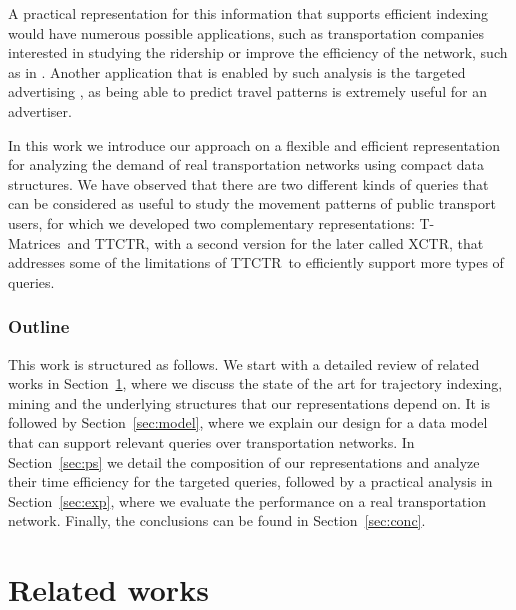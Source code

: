 \documentclass[runningheads]{llncs}
\newcommand{\acumm}{T-Matrices} %
\newcommand{\ctr}{XCTR}
\newcommand{\ttctr}{TTCTR}
\begin{document}
A practical representation for this information that supports efficient indexing would have numerous possible applications, such as transportation companies interested in studying the ridership \cite{tu2018spatial} or improve the efficiency of the network, such as in \cite{weng2018mining}. Another application that is enabled by such analysis is the targeted advertising \cite{zhang2017targeted}, as being able to predict travel patterns is extremely useful for an advertiser.


In this work we introduce our approach on a flexible and efficient representation for analyzing the demand of real transportation networks using compact data structures. We have observed that there are two different kinds of queries that can be considered as useful to study the movement patterns of public transport users, for which we developed two complementary representations: \acumm~and \ttctr, with a second version for the later called \ctr, that addresses some of the limitations of \ttctr~to efficiently support more types of queries.

\subsubsection{Outline}
This work is structured as follows. We start with a detailed review of related works in Section~\ref{sec:rw}, where we discuss the state of the art for trajectory indexing, mining and the underlying structures that our representations depend on. It is followed by Section~\ref{sec:model}, where we explain our design for a data model that can support relevant queries over transportation networks. In Section~\ref{sec:ps} we detail the composition of our representations and analyze their time efficiency for the targeted queries, followed by a practical analysis in Section~\ref{sec:exp}, where we evaluate the performance on a real transportation network. Finally, the conclusions can be found in Section~\ref{sec:conc}.


\section{Related works}
\label{sec:rw}
\end{document}
